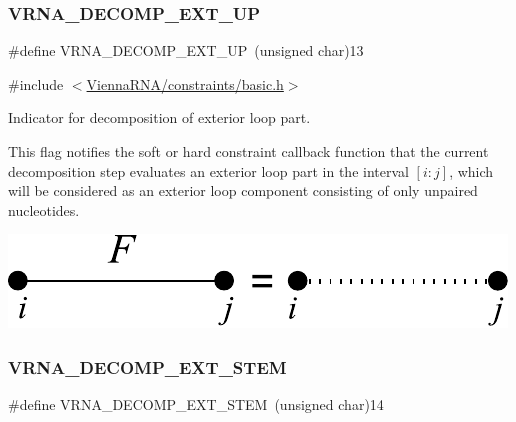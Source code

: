 \subsubsection{\texorpdfstring{V\+R\+N\+A\+\_\+\+D\+E\+C\+O\+M\+P\+\_\+\+E\+X\+T\+\_\+\+UP}{VRNA\_DECOMP\_EXT\_UP}}
{\footnotesize\ttfamily \#define V\+R\+N\+A\+\_\+\+D\+E\+C\+O\+M\+P\+\_\+\+E\+X\+T\+\_\+\+UP~(unsigned char)13}



{\ttfamily \#include $<$\hyperlink{constraints_2basic_8h}{Vienna\+R\+N\+A/constraints/basic.\+h}$>$}



Indicator for decomposition of exterior loop part. 

This flag notifies the soft or hard constraint callback function that the current decomposition step evaluates an exterior loop part in the interval $[i:j]$, which will be considered as an exterior loop component consisting of only unpaired nucleotides.

 
\begin{DoxyImageNoCaption}
  \mbox{\includegraphics[width=\textwidth,height=\textheight/2,keepaspectratio=true]{decomp_ext_up}}
\end{DoxyImageNoCaption}
 \mbox{\label{group__constraints_gae44b5ace0d9b4a29088069ecb4cec441}} 
\subsubsection{\texorpdfstring{V\+R\+N\+A\+\_\+\+D\+E\+C\+O\+M\+P\+\_\+\+E\+X\+T\+\_\+\+S\+T\+EM}{VRNA\_DECOMP\_EXT\_STEM}}
{\footnotesize\ttfamily \#define V\+R\+N\+A\+\_\+\+D\+E\+C\+O\+M\+P\+\_\+\+E\+X\+T\+\_\+\+S\+T\+EM~(unsigned char)14}



